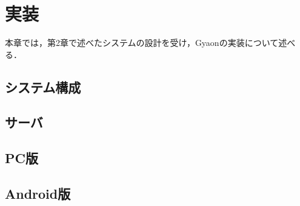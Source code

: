 \chapter{実装}
\label{chap:implementation}

本章では，第2章で述べたシステムの設計を受け，Gyaonの実装について述べる．

\newpage

\section{システム構成}

\section{サーバ}

\section{PC版}

\section{Android版}
